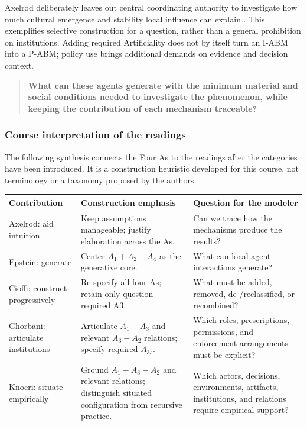 \documentclass[11pt,a4paper]{article}
\begin{document}
Axelrod deliberately leaves out central coordinating authority to investigate how much cultural emergence and stability local influence can explain \cite[p.~207]{axelrod_dissemination_1997}. This exemplifies selective construction for a question, rather than a general prohibition on institutions. Adding required Artificiality does not by itself turn an I-ABM into a P-ABM; policy use brings additional demands on evidence and decision context.

\begin{quote}
\textbf{What can these agents generate with the minimum material and social conditions needed to investigate the phenomenon, while keeping the contribution of each mechanism traceable?}
\end{quote}

\subsubsection{Course interpretation of the readings}
The following synthesis connects the Four As to the readings after the categories have been introduced. It is a construction heuristic developed for this course, not terminology or a taxonomy proposed by the authors.

\renewcommand{\arraystretch}{1.2}
\noindent\begin{tabularx}{\linewidth}{@{}p{3.1cm}YY@{}}
\toprule
\textbf{Contribution} & \textbf{Construction emphasis} & \textbf{Question for the modeler}\\\midrule
Axelrod: aid intuition & Keep assumptions manageable; justify elaboration across the As. & Can we trace how the mechanisms produce the results?\\
Epstein: generate & Center $A_1+A_2+A_4$ as the generative core. & What can local agent interactions generate?\\
Cioffi: construct progressively & Re-specify all four As; retain only question-required A3. & What must be added, removed, de-/reclassified, or recombined?\\
Ghorbani: articulate institutions & Articulate $A_1-A_3$ and relevant $A_3-A_2$ relations; specify required $A_{3s}$. & Which roles, prescriptions, permissions, and enforcement arrangements must be explicit?\\
Knoeri: situate empirically & Ground $A_1-A_3-A_2$ and relevant relations; distinguish situated configuration from recursive practice. & Which actors, decisions, environments, artifacts, institutions, and relations require empirical support?\\\bottomrule
\end{tabularx}
\end{document}

